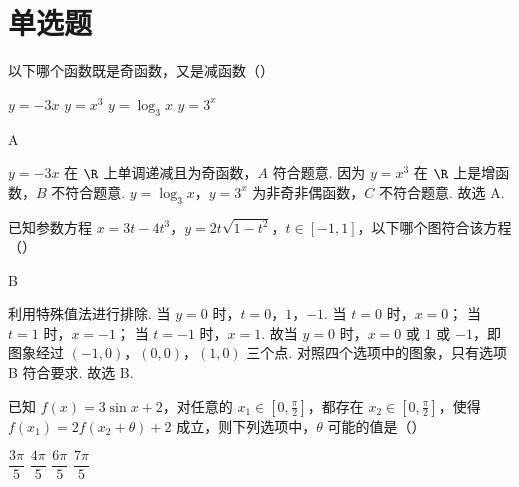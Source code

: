 \section{单选题}

\begin{problem}
以下哪个函数既是奇函数，又是减函数（\quad）

\choices
    {\(y=-3x\)}
    {\(y=x^3\)}
    {\(y=\log_3 x\)}
    {\(y=3^x\)}
\end{problem}

\begin{answer}
A
\end{answer}

\begin{solution}
\(y=-3x\) 在 \(\R\) 上单调递减且为奇函数，\(A\) 符合题意.
因为 \(y=x^3\) 在 \(\R\) 上是增函数，\(B\) 不符合题意.
\(y=\log_3 x\)，\(y=3^x\) 为非奇非偶函数，\(C\) 不符合题意.
故选 A.
\end{solution}

\begin{problem}
已知参数方程 \(x=3t-4t^3\)，\(y=2t\sqrt{1-t^2}\)，\(t\in[-1,1]\)，以下哪个图符合该方程（\quad）

    {}
    {}
    {}
\end{problem}

\begin{answer}
B
\end{answer}

\begin{solution}
利用特殊值法进行排除. 当 \(y=0\) 时，\(t=0\)，\(1\)，\(-1\). 当 \(t=0\) 时，\(x=0\)； 当 \(t=1\) 时，\(x=-1\)； 当 \(t=-1\) 时，\(x=1\). 故当 \(y=0\) 时，\(x=0\) 或 \(1\) 或 \(-1\)，即图象经过 \((-1,0)\)，\((0,0)\)，\((1,0)\) 三个点. 对照四个选项中的图象，只有选项 B 符合要求. 故选 B.
\end{solution}

\begin{problem}
已知 \(f(x)=3\sin x+2\)，对任意的 \(x_1\in\left[ 0,\frac{\pi}{2} \right]\)，都存在 \(x_2\in\left[ 0,\frac{\pi}{2} \right]\)，使得 \(f(x_1)=2f(x_2+\theta)+2\) 成立，则下列选项中，\(\theta\) 可能的值是（\quad）

\choices
    {\(\dfrac{3\pi}{5}\)}
    {\(\dfrac{4\pi}{5}\)}
    {\(\dfrac{6\pi}{5}\)}
    {\(\dfrac{7\pi}{5}\)}
\end{problem}

